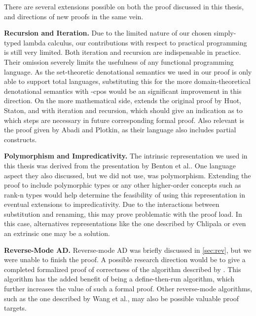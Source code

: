 There are several extensions possible on both the proof discussed in this thesis, and directions of new proofs in the same vein.

\textbf{Recursion and Iteration.} Due to the limited nature of our chosen simply-typed lambda calculus, our contributions with respect to practical programming is still very limited.
Both iteration and recursion are indispensable in practice.
Their omission severely limits the usefulness of any functional programming language.
As the set-theoretic denotational semantics we used in our proof is only able to support total languages, substituting this for the more domain-theoretical denotational semantics with \omega-cpos would be an significant improvement in this direction.
On the more mathematical side, \Vakar{}\cite{vkr2020denotational} extends the original proof by Huot, Staton, and \Vakar{}\cite{huot2020correctness} with iteration and recursion, which should give an indication as to which steps are necessary in future corresponding formal proof.
Also relevant is the proof given by Abadi and Plotkin\cite{10.1145/3371106}, as their language also includes partial constructs.

\textbf{Polymorphism and Impredicativity.} The intrinsic representation we used in this thesis was derived from the presentation by Benton et al.\cite{Benton2011}.
One language aspect they also discussed, but we did not use, was polymorphism.
Extending the proof to include polymorphic types or any other higher-order concepts such as rank-n types would help determine the feasibility of using this representation in eventual extensions to impredicativity.
Due to the interactions between substitution and renaming, this may prove problematic with the proof load.
In this case, alternatives representations like the one described by Chlipala\cite{10.1145/1411203.1411226} or even an extrinsic one may be a solution.

\textbf{Reverse-Mode AD.} Reverse-mode AD was briefly discussed in \cref{sec:rev}, but we were unable to finish the proof.
A possible research direction would be to give a completed formalized proof of correctness of the algorithm described by \Vakar{}\cite{vkr2020reverse}.
This algorithm has the added benefit of being a define-then-run algorithm, which further increases the value of such a formal proof.
Other reverse-mode algorithms, such as the one described by Wang et al.\cite{ShiftReset:Backprop}, may also be possible valuable proof targets.

